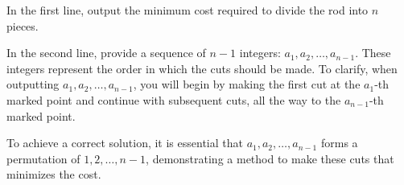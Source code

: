 In the first line, output the minimum cost required to divide the rod into $n$ pieces.

In the second line, provide a sequence of $n - 1$ integers: $a_1, a_2, \ldots, a_{n-1}$. These integers represent the order in which the cuts should be made. To clarify, when outputting $a_1, a_2, \ldots, a_{n-1}$, you will begin by making the first cut at the $a_1$-th marked point and continue with subsequent cuts, all the way to the $a_{n-1}$-th marked point.

To achieve a correct solution, it is essential that $a_1, a_2, \ldots, a_{n-1}$ forms a permutation of $1, 2, \ldots, n-1$, demonstrating a method to make these cuts that minimizes the cost.